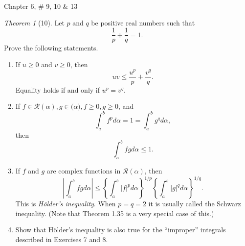 \documentclass[12pt]{article}
\theoremstyle{remark}
\theoremstyle{named}
\newtheorem*{theorem}{Theorem}
\renewcommand{\a}{\alpha}
\newcommand{\abs}[1]{|#1|}
\newcommand{\bigabs}[1]{\left|#1\right|}
\begin{document}
Chapter 6, \# 9, 10 \& 13

\begin{theorem}[10]
    Let \(p\) and \(q\) be positive real numbers such that 
    \[\frac{1}{p} + \frac{1}{q} = 1.\]
    Prove the following statements.
    \begin{enumerate}
        \item If \(u \ge 0\) and \(v \ge 0\), then 
        \[uv \le \frac{u^p}{p} + \frac{v^q}{q}.\]
        Equality holds if and only if \(u^p = v^q\). 
        \item If \(f \in \mathcal R(\a), g \in \mathcal (\a), f \ge 0, g \ge 0\), and
        \[\int_a^b f^p d\a = 1 = \int_a^b g^q d\a,\]
        then
        \[\int_a^b fg d \a \le 1.\]
        \item If \(f\) and \(g\) are complex functions in \(\mathcal R (\a)\), then 
        \[\bigabs{\int_a^b fg d \a} \le \left\{\int_a^b \abs{f}^p d\a\right\}^{1/p} \left\{\int_a^b \abs{g}^q d\a\right\}^{1/q}.\]
        This is \textit{H\"{o}lder's inequality}. When \(p = q = 2\) it is usually called the Schwarz inequality. (Note that Theorem 1.35 is a very special case of this.)
        \item Show that H\"{o}lder's inequality is also true for the ``improper'' integrals described in Exercises 7 and 8.
    \end{enumerate}
\end{theorem}
\end{document}
